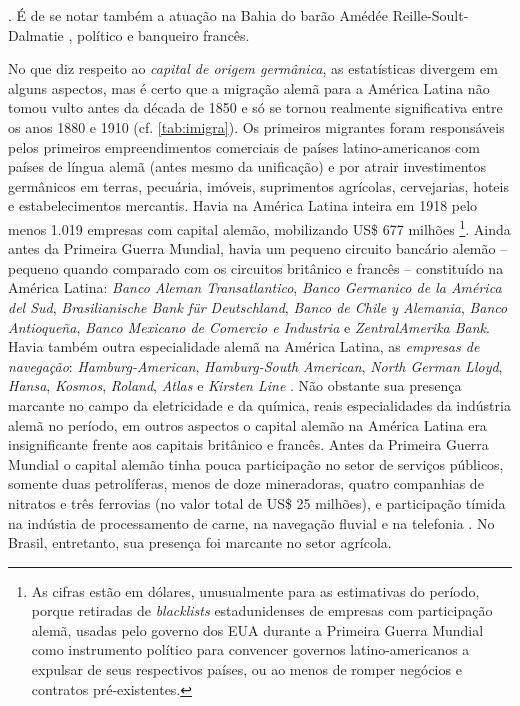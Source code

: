 \cite{somogyi_lafont_1990}. É de se notar também a atuação na Bahia do barão Amédée Reille-Soult-Dalmatie \cite[pp.~116-120]{CUNHA2011}, político e banqueiro francês.

No que diz respeito ao \textit{capital de origem germânica}, as estatísticas divergem em alguns aspectos, mas é certo que a migração alemã para a América Latina não tomou vulto antes da década de 1850 \cite[p.~65]{rippy_german_1948} e só se tornou realmente significativa entre os anos 1880 e 1910 (cf. \autoref{tab:imigra}). Os primeiros migrantes foram responsáveis pelos primeiros empreendimentos comerciais de países latino-americanos com países de língua alemã (antes mesmo da unificação) e por atrair investimentos germânicos em terras, pecuária, imóveis, suprimentos agrícolas, cervejarias, hoteis e estabelecimentos mercantis. Havia na América Latina inteira em 1918 pelo menos 1.019 empresas com capital alemão, mobilizando US\$ 677 milhões \cite[p.~64-65]{rippy_german_1948}\footnote{As cifras estão em dólares, unusualmente para as estimativas do período, porque retiradas de \textit{blacklists} estadunidenses de empresas com participação alemã, usadas pelo governo dos EUA durante a Primeira Guerra Mundial como instrumento político para convencer governos latino-americanos a expulsar de seus respectivos países, ou ao menos de romper negócios e contratos pré-existentes.}. Ainda antes da Primeira Guerra Mundial, havia um pequeno circuito bancário alemão -- pequeno quando comparado com os circuitos britânico e francês -- constituído na América Latina: \textit{Banco Aleman Transatlantico}, \textit{Banco Germanico de la América del Sud}, \textit{Brasilianische Bank für Deutschland}, \textit{Banco de Chile y Alemania}, \textit{Banco Antioqueña}, \textit{Banco Mexicano de Comercio e Industria} e \textit{ZentralAmerika Bank}. Havia também outra especialidade alemã na América Latina, as \textit{empresas de navegação}: \textit{Hamburg-American}, \textit{Hamburg-South American}, \textit{North German Lloyd}, \textit{Hansa}, \textit{Kosmos}, \textit{Roland}, \textit{Atlas} e \textit{Kirsten Line} \cite{rippy_german_1948}. Não obstante sua presença marcante no campo da eletricidade e da química, reais especialidades da indústria alemã no período, em outros aspectos o capital alemão na América Latina era insignificante frente aos capitais britânico e francês. Antes da Primeira Guerra Mundial o capital alemão tinha pouca participação no setor de serviços públicos, somente duas petrolíferas, menos de doze mineradoras, quatro companhias de nitratos e três ferrovias (no valor total de US\$ 25 milhões), e participação tímida na indústia de processamento de carne, na navegação fluvial e na telefonia \cite{rippy_german_1948}. No Brasil, entretanto, sua presença foi marcante no setor agrícola.

